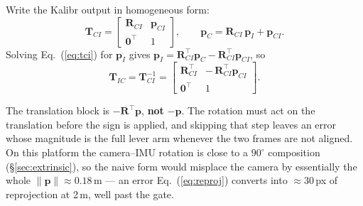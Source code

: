 Write the Kalibr output in homogeneous form:
\begin{equation}
\mathbf{T}_{CI} =
\begin{bmatrix} \mathbf{R}_{CI} & \mathbf{p}_{CI} \\[2pt]
                \mathbf{0}^{\top} & 1 \end{bmatrix},
\qquad
\mathbf{p}_C = \mathbf{R}_{CI}\,\mathbf{p}_I + \mathbf{p}_{CI}.
\label{eq:tci}
\end{equation}
Solving Eq.~(\ref{eq:tci}) for $\mathbf{p}_I$ gives
$\mathbf{p}_I = \mathbf{R}_{CI}^{\top}\mathbf{p}_C -
\mathbf{R}_{CI}^{\top}\mathbf{p}_{CI}$, so
\begin{equation}
\boxed{\;
\mathbf{T}_{IC} = \mathbf{T}_{CI}^{-1} =
\begin{bmatrix} \mathbf{R}_{CI}^{\top} & -\,\mathbf{R}_{CI}^{\top}\mathbf{p}_{CI} \\[2pt]
                \mathbf{0}^{\top} & 1 \end{bmatrix}. \;}
\label{eq:seinv}
\end{equation}

The translation block is $-\mathbf{R}^{\top}\mathbf{p}$, \textbf{not}
$-\mathbf{p}$. The rotation must act on the translation before the sign is
applied, and skipping that step leaves an error whose magnitude is the full
lever arm whenever the two frames are not aligned. On this platform the
camera--IMU rotation is close to a $90^\circ$ composition
(\S\ref{sec:extrinsic}), so the naive form would misplace the camera by
essentially the whole $\lVert\mathbf{p}\rVert \approx 0.18$\,m --- an error
Eq.~(\ref{eq:reproj}) converts into ${\approx}30$\,px of reprojection at
2\,m, well past the gate.

\begin{center}
\end{center}

